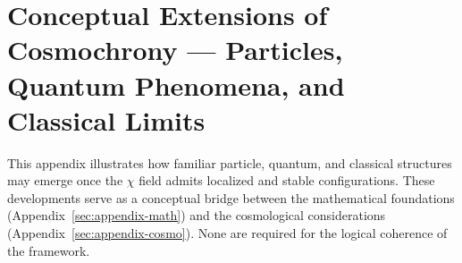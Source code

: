 \clearpage

\section{Conceptual Extensions of Cosmochrony --- Particles, Quantum Phenomena, and Classical Limits}
\label{sec:appendix-conceptual}

This appendix illustrates how familiar particle, quantum, and classical
structures may emerge once the $\chi$ field admits localized and stable configurations.
These developments serve as a conceptual bridge between the
mathematical foundations (Appendix~\ref{sec:appendix-math}) and the cosmological considerations
(Appendix~\ref{sec:appendix-cosmo}).
None are required for the logical coherence of the framework.



























